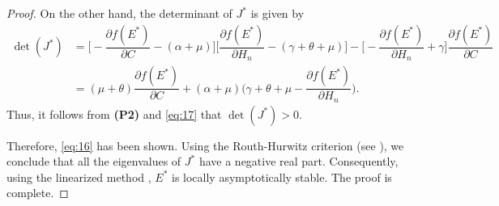 \documentclass[11pt]{article}
\theoremstyle{definition}
\theoremstyle{remark}
\numberwithin{equation}{section}
\begin{document}
\begin{proof}
On the other hand, the determinant of $J^*$ is given by
\begin{equation*}
\begin{split}
   \det(J^*) &=  \bigg[-\dfrac{\partial f(E^*)}{\partial C} - (\alpha + \mu)\bigg]\bigg[\dfrac{\partial f(E^*)}{\partial H_n} - (\gamma + \theta + \mu)\bigg] - \bigg[-\dfrac{\partial f(E^*)}{\partial H_n} + \gamma\bigg]\dfrac{\partial f(E^*)}{\partial C}\\
   &= (\mu + \theta)\dfrac{\partial f(E^*)}{\partial C} + (\alpha + \mu)\bigg(\gamma + \theta + \mu - \dfrac{\partial f(E^*)}{\partial H_n}\bigg).
\end{split}
\end{equation*}
Thus, it follows from \textbf{(P2)}  and \eqref{eq:17} that $\det(J^*) > 0$.

Therefore, \eqref{eq:16} has been shown. Using the Routh-Hurwitz criterion (see \cite[Theorem 4.4]{Allen}), we conclude that all the eigenvalues of $J^*$ have a negative real part. 
Consequently, using the linearized method \cite{Khalil, Stuart}, $E^*$ is locally asymptotically stable.
The proof is complete.
\end{proof}

\end{document}
